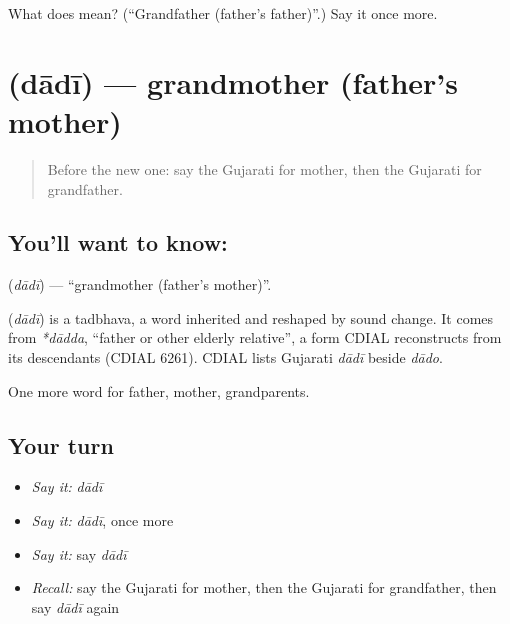 \begin{tcolorbox}[breakable,colback=teal!4,colframe=teal!35!black,title={Before you move on}]
What does  mean? (\textquotedblleft{}Grandfather (father's father)\textquotedblright{}.) Say it once more.
\end{tcolorbox}
\section[\texorpdfstring{\gu{દાદી} (dādī)}{દાદી (dādī)}]{ (dādī) — grandmother (father's mother)}

\label{lesson:GU-C51-grandmother}



\begin{quote}
Before the new one: say the Gujarati for mother, then the Gujarati for grandfather.
\end{quote}

\subsection*{You'll want to know: }
\textbf{} (\emph{dādī}) — \textquotedblleft{}grandmother (father's mother)\textquotedblright{}.

\begin{cousinweb}
\textbf{} (\emph{dādī}) is a tadbhava, a word inherited and reshaped by sound change. It comes from \emph{*dādda}, \textquotedblleft{}father or other elderly relative\textquotedblright{}, a form CDIAL reconstructs from its descendants (CDIAL 6261). CDIAL lists Gujarati \emph{dādī} beside \emph{dādo}.
\end{cousinweb}

\begin{grammarlens}[title={What you've built}]
One more word for father, mother, grandparents.
\end{grammarlens}

\subsection*{Your turn}
\begin{itemize}
\raggedright
  \item \emph{Say it:} \emph{dādī}
  \item \emph{Say it:} \emph{dādī}, once more
  \item \emph{Say it:} say \emph{dādī}
  \item \emph{Recall:} say the Gujarati for mother, then the Gujarati for grandfather, then say \emph{dādī} again
\end{itemize}

